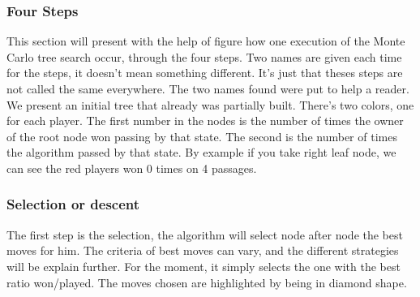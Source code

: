 \subsubsection{Four Steps}
This section will present with the help of figure how one execution of the Monte Carlo tree search occur, through the four steps. Two names are given each time for the steps, it doesn't mean something different. It's just that theses steps are not called the same everywhere. The two names found were put to help a reader. We present an initial tree that already was partially built. There's two colors, one for each player. The first number in the nodes is the number of times the owner of the root node won passing by that state. The second is the number of times the algorithm passed by that state. By example if you take right leaf node, we can see the red players won 0 times on 4 passages. 
\begin{center}
\end{center}

\subsubsection{Selection or descent}
The first step is the selection, the algorithm will select node after node the best moves for him. The criteria of best moves can vary, and the different strategies will be explain further. For the moment, it simply selects the one with the best ratio won/played. The moves chosen are highlighted by being in diamond shape. 

\begin{center}
\end{center}
